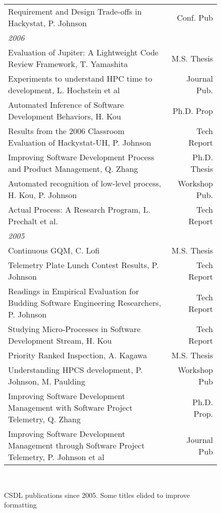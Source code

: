 \documentclass[11pt]{article}
\begin{document}
\begin{figure}[ht]
\begin{tabular}{p{5.5in}r}
Requirement and Design Trade-offs in Hackystat, P. Johnson  & Conf. Pub \\
{\em 2006} & \\
Evaluation of Jupiter: A Lightweight Code Review Framework, T. Yamashita & M.S. Thesis \\
Experiments to understand HPC time to development, L. Hochstein et al  & Journal Pub. \\
Automated Inference of Software Development Behaviors, H. Kou  & Ph.D. Prop \\
Results from the 2006 Classroom Evaluation of Hackystat-UH, P. Johnson  & Tech Report \\
Improving Software Development Process and Product Management, Q. Zhang  & Ph.D. Thesis \\
Automated recognition of low-level process, H. Kou, P. Johnson  & Workshop Pub. \\
Actual Process: A Research Program, L. Prechalt et al.  & Tech Report \\
{\em 2005} & \\
Continuous GQM, C. Lofi  & M.S. Thesis \\
Telemetry Plate Lunch Contest Results, P. Johnson  & Tech Report \\
Readings in Empirical Evaluation for Budding Software Engineering Researchers, P. Johnson  & Tech Report \\
Studying Micro-Processes in Software Development Stream, H. Kou  & Tech Report \\
Priority Ranked Inspection, A. Kagawa  & M.S. Thesis \\
Understanding HPCS development, P. Johnson, M. Paulding  & Workshop Pub \\
Improving Software Development Management with Software Project Telemetry, Q. Zhang  & Ph.D. Prop. \\
Improving Software Development Management through Software Project Telemetry, P. Johnson et al  & Journal Pub \\ \hline
\end{tabular} \\ 
\normalsize
\caption{CSDL publications since 2005. Some titles elided to improve formatting}
\label{fig:pubs}
\end{figure}






\end{document}
